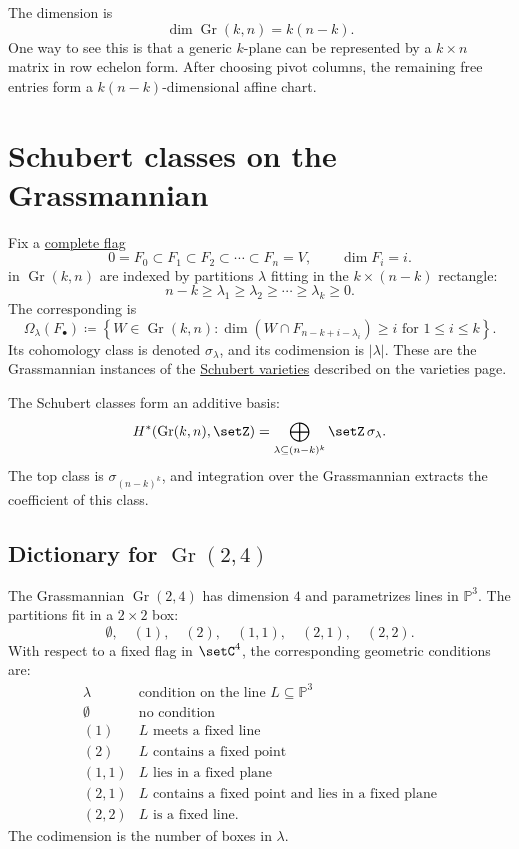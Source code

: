 The dimension is
\[
  \dim \operatorname{Gr}(k,n)=k(n-k).
\]
One way to see this is that a generic $k$-plane can be represented by a
$k\times n$ matrix in row echelon form.  After choosing pivot columns, the
remaining free entries form a $k(n-k)$-dimensional affine chart.


\section[grassmannianSchubertClasses]{Schubert classes on the Grassmannian}

Fix a \hyperref[flagVarieties]{complete flag}
\[
  0=F_0\subset F_1\subset F_2\subset\dotsb\subset F_n=V,
  \qquad \dim F_i=i.
\]
\label{grassmannianSchubertClassDefinition}
in $\operatorname{Gr}(k,n)$ are indexed by partitions
$\lambda$ fitting in the $k\times(n-k)$ rectangle:
\[
  n-k\geq \lambda_1\geq \lambda_2\geq\dotsb\geq\lambda_k\geq 0.
\]
The corresponding \label{schubertVarietyDefinition} is
\[
  \Omega_\lambda(F_\bullet)
  \coloneqq
  \left\{
    W\in\operatorname{Gr}(k,n):
    \dim(W\cap F_{n-k+i-\lambda_i})\geq i
    \text{ for } 1\leq i\leq k
  \right\}.
\]
Its cohomology class is denoted $\sigma_\lambda$, and its codimension is
$|\lambda|$.  These are the Grassmannian instances of the
\hyperref[schubertVarietyGeometryDefinition]{Schubert varieties} described on
the varieties page.

The Schubert classes form an additive basis:
\[
  H^*(\operatorname{Gr}(k,n),\setZ)
  =
  \bigoplus_{\lambda\subseteq (n-k)^k}\setZ\,\sigma_\lambda.
\]
The top class is $\sigma_{(n-k)^k}$, and integration over the Grassmannian
extracts the coefficient of this class.


\subsection[grassmannianSchubertDictionary]{Dictionary for $\operatorname{Gr}(2,4)$}

The Grassmannian $\operatorname{Gr}(2,4)$ has dimension $4$ and parametrizes
lines in $\mathbb{P}^3$.  The partitions fit in a $2\times 2$ box:
\[
  \emptyset,\quad (1),\quad (2),\quad (1,1),\quad (2,1),\quad (2,2).
\]
With respect to a fixed flag in $\setC^4$, the corresponding geometric
conditions are:
\[
\begin{array}{c|l}
\lambda & \text{condition on the line } L\subseteq\mathbb{P}^3\\
\hline
\emptyset & \text{no condition}\\
(1) & L \text{ meets a fixed line}\\
(2) & L \text{ contains a fixed point}\\
(1,1) & L \text{ lies in a fixed plane}\\
(2,1) & L \text{ contains a fixed point and lies in a fixed plane}\\
(2,2) & L \text{ is a fixed line.}
\end{array}
\]
The codimension is the number of boxes in $\lambda$.


